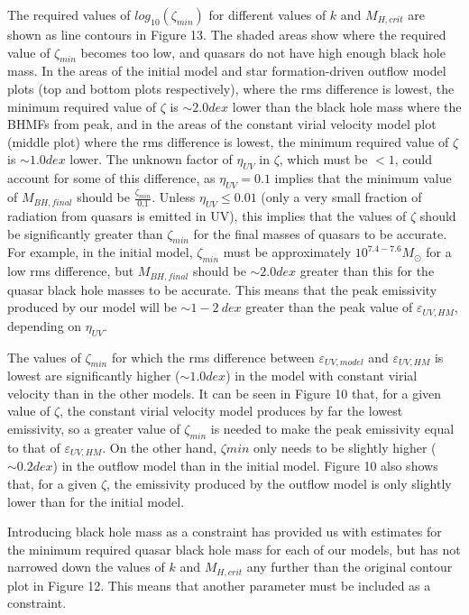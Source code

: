 \documentclass[12pt]{article}%
\begin{document}
The required values of $log_{10}(\zeta_{min})$ for different values of $k$ and $M_{H,crit}$ are shown as line contours in Figure 13. The shaded areas show where the required value of $\zeta_{min}$ becomes too low, and quasars do not have high enough black hole mass. In the areas of the initial model and star formation-driven outflow model plots (top and bottom plots respectively), where the rms difference is lowest, the minimum required val\-ue of $\zeta$ is $\sim2.0dex$ lower than the black hole mass where the BHMFs from \citeauthor{BH_mass_fns} peak, and in the areas of the constant virial velocity model plot (middle plot) where the rms difference is lowest, the minimum required val\-ue of $\zeta$ is $\sim1.0dex$ lower. The unknown factor of $\eta_{UV}$ in $\zeta$, which must be $<1$, could account for some of this difference, as $\eta_{UV}=0.1$ implies that the minimum value of $M_{BH,final}$ should be $\frac{\zeta_{min}}{0.1}$. Unless $\eta_{UV}\leq0.01$ (only a very small fraction of radiation from quasars is emitted in UV), this implies that the values of $\zeta$ should be significantly greater than $\zeta_{min}$ for the final masses of quasars to be accurate. For example, in the initial model, $\zeta_{min}$ must be approximately $10^{7.4-7.6}M_\odot$ for a low rms difference, but $M_{BH,final}$ should be $\sim2.0dex$ greater than this for the quasar black hole mass\-es to be accurate. This means that the peak emissivity produced by our model will be $\sim1-2\:dex$ greater than the peak value of $\varepsilon_{UV,HM}$, depending on $\eta_{UV}$.\par

The values of $\zeta_{min}$ for which the rms difference between $\varepsilon_{UV,model}$ and $\varepsilon_{UV,HM}$ is lowest are significantly higher ($\sim1.0dex$) in the model with constant virial velocity than in the other models. It can be seen in Figure 10 that, for a given value of $\zeta$, the constant virial velocity model produces by far the lowest emissivity, so a greater value of $\zeta_{min}$ is needed to make the peak emissivity equal to that of $\varepsilon_{UV,HM}$. On the other hand, $\zeta{min}$ only needs to be slightly higher ($\sim0.2dex$) in the outflow model than in the initial model. Figure 10 also shows that, for a given $\zeta$, the emissivity produced by the outflow model is only slightly lower than for the initial model.\par

Introducing black hole mass as a constraint has provided us with estimates for the minimum required quasar black hole mass for each of our models, but has not narrowed down the values of $k$ and $M_{H,crit}$ any further than the original contour plot in Figure 12. This means that another parameter must be included as a constraint.
\end{document}
